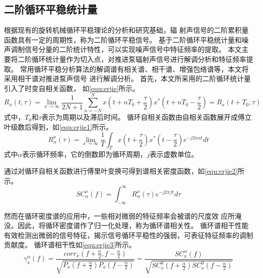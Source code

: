 \subsection{二阶循环平稳统计量}
根据现有的旋转机械循环平稳理论的分析和研究基础，辐
射声信号的二阶累积量函数具有一定的周期性，称为二阶循环平稳信号。
基于二阶循环平稳统计量和噪声调制信号分量的二阶统计特性，可以实现噪声信号中特征频率的提取。
本文主要将二阶循环统计量作为切入点，对推进泵辐射声信号进行解调分析和特征频率提取。
常用循环平稳分析算法的解调谱有相关谱、相干谱、增强包络谱等，本文将采用相干谱对推进泵声信号
进行解调分析。
首先，本文所采用的二阶循环统计量引入了时变自相关函数，
如\autoref{equ:erjie}所示。 
\begin{equation}
    \label{equ:erjie}
    R_{x} \left ( t,\tau  \right ) =\lim_{x \to \infty} \frac{1}{2N+1} \sum_{n=-N}^{N} x\left ( t+nT_0+\frac{\tau }{2}  \right )x^{\ast }\left ( t+nT_0-\frac{\tau }{2}  \right )=R_{x}\left ( t+T_0,\tau  \right )    
\end{equation}
式中，$T_0$和$\tau$表示为周期以及滞后时间。
循环自相关函数由自相关函数展开成傅立叶级数后得到，如\autoref{equ:erjie1}所示。
\begin{equation}
    \label{equ:erjie1}
    R_{\alpha }^{x} \left ( \tau  \right ) =\lim_{x \to \infty} \frac{1}{T}\int_{T}^{}x\left ( t+\frac{\tau }{2}  \right )x^{\ast } \left ( t-\frac{\tau }{2} \right ) e^{-j2\pi \alpha t} dt   
\end{equation}
式中$\alpha$表示循环频率，它的倒数即为循环周期，$j$表示虚数单位。

通过对循环自相关函数进行傅里叶变换可得到谱相关密度函数，如\autoref{equ:erjie2}所示。
\begin{equation}
    \label{equ:erjie2}
    SC_{\alpha }^{x} \left ( f  \right ) =\int_{-\infty }^{\infty } R_{\alpha }^{x}\left ( \tau  \right )  e^{-j2\pi f t} d\tau   
\end{equation}

然而在循环密度谱的应用中，一些相对微弱的特征频率会被谱的尺度效
应所淹没。因此，将循环密度谱作了归一化处理，称为循环谱相关性。
循环谱相干性能有效检测出微弱的信号特征，揭示信号循环平稳性的强弱，可表征特征频率的调制贡献度\cite{li2018}。
循环谱相干性如\autoref{equ:erjie3}所示。
\begin{equation}
    \label{equ:erjie3}
    \gamma _{x}^{\alpha}\left ( f \right ) =\frac{corr_{x}\left ( f+\frac{\alpha }{2}, f-\frac{\alpha }{2} \right )  }{\sqrt{P_{x}\left ( f+\frac{\alpha }{2} \right )P_{x}\left ( f-\frac{\alpha }{2} \right ) } } =\frac{SC_{x}^{\alpha }\left ( f \right )  }{\sqrt{SC_{x}^{0} \left ( f+\frac{\alpha }{2} \right )SC_{x}^{0} \left ( f-\frac{\alpha }{2} \right )} }  
\end{equation}

